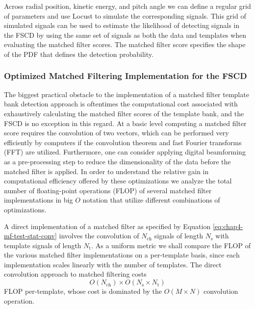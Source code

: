 Across radial position, kinetic energy, and pitch angle we can define a regular grid of parameters and use Locust to simulate the corresponding signals. This grid of simulated signals can be used to estimate the likelihood of detecting signals in the FSCD by using the same set of signals as both the data and templates when evaluating the matched filter scores. The matched filter score specifies the shape of the PDF that defines the detection probability.

\subsubsection*{Optimized Matched Filtering Implementation for the FSCD}

The biggest practical obstacle to the implementation of a matched filter template bank detection approach is oftentimes the computational cost associated with exhaustively calculating the matched filter scores of the template bank, and the FSCD is no exception in this regard. At a basic level computing a matched filter score requires the convolution of two vectors, which can be performed very efficiently by computers if the convolution theorem and fast Fourier transforms (FFT) are utilized. Furthermore, one can consider applying digital beamforming as a pre-processing step to reduce the dimensionality of the data before the matched filter is applied. In order to understand the relative gain in computational efficiency offered by these optimizations we analyze the total number of floating-point operations (FLOP) of several matched filter implementations in big $O$ notation that utilize different combinations of optimizations. 

A direct implementation of a matched filter as specified by Equation \ref{eq:chap4-mf-test-stat-conv} involves the convolution of $N_\mathrm{ch}$ signals of length $N_\mathrm{s}$ with template signals of length $N_\mathrm{t}$. As a uniform metric we shall compare the FLOP of the various matched filter implementations on a per-template basis, since each implementation scales linearly with the number of templates. The direct convolution approach to matched filtering costs
\begin{equation}
    O(N_\mathrm{ch})\times O(N_\mathrm{s}\times N_\mathrm{t})
\end{equation}
FLOP per-template, whose cost is dominated by the $O(M\times N)$ convolution operation. 

